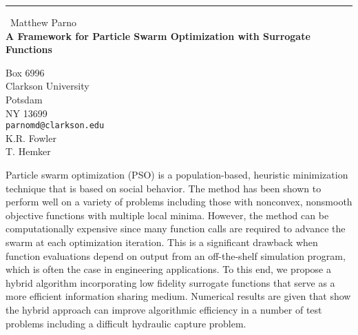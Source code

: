 \documentclass{report}
\begin{document}
\begin{center}
\rule{6in}{1pt} \
{\large Matthew Parno \\
{\bf A Framework for Particle Swarm Optimization with Surrogate Functions}}

Box 6996 \\ Clarkson University \\ Potsdam \\ NY 13699
\\
{\tt parnomd@clarkson.edu}\\
K.R. Fowler\\
T. Hemker\end{center}

Particle swarm optimization (PSO) is a population-based, heuristic
minimization technique that is based on social behavior. The
method has been shown to perform well on a variety of problems
including those with nonconvex, nonsmooth objective functions with
multiple local minima. However, the method can be computationally
expensive since many function calls are required to
advance the swarm at each optimization iteration. This is a
significant drawback when function evaluations depend on output
from an off-the-shelf simulation program, which is often the case
in engineering applications. To this end, we propose a hybrid algorithm
incorporating low fidelity surrogate functions that serve as a more
efficient information sharing medium. Numerical results are given that
show the hybrid approach can improve algorithmic efficiency in a number
of test problems including a difficult hydraulic capture problem.
\end{document}
